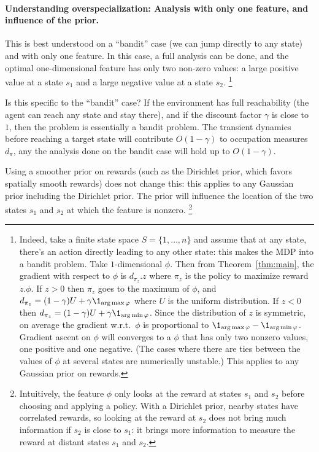 \documentclass[11pt,a4paper]{article}
\begin{document}
\paragraph{Understanding overspecialization: Analysis with only one
feature, and influence of the prior.}
This is best understood on a ``bandit'' case (we can jump directly to any
state) and with only one feature.
In this case, a full analysis can be done, and the optimal
one-dimensional feature has only two non-zero values: a large positive
value at a state $s_1$ and a large negative value at a state $s_2$.
\footnote{Indeed, take
a finite state space $S=\{1,\ldots,n\}$ and assume that at any state,
there's an action directly leading to any other state: this makes the MDP
into a bandit problem.
Take $1$-dimensional $\phi$. Then from
Theorem~\ref{thm:main}, the gradient with respect to $\phi$ is
$d_{\pi_z}.z$ where $\pi_z$ is the policy to maximize reward $z.\phi$. If
$z>0$ then $\pi_z$ goes to the maximum of $\phi$, and
$d_{\pi_z}=(1-\gamma)U+\gamma \1_{\argmax \phi}$ where $U$ is the uniform
distribution. If $z<0$ then $d_{\pi_z}=(1-\gamma)U+\gamma \1_{\argmin
\phi}$. Since the distribution of $z$ is symmetric, on average the
gradient w.r.t.\ $\phi$ is proportional to $\1_{\argmax
\phi}-\1_{\argmin\phi}$. Gradient ascent on $\phi$ will converges to a
$\phi$ that has only two nonzero values, one positive and one negative.
(The cases where there are ties between the values of $\phi$ at several
states are numerically unstable.)
This applies to any Gaussian prior on rewards.
}

Is this specific to the ``bandit'' case? If the environment has full
reachability (the agent can reach any state and stay there), and if
the discount factor $\gamma$ is close to $1$, then the problem is
essentially a bandit problem. The transient dynamics before reaching a
target state will contribute $O(1-\gamma)$ to occupation measures
$d_\pi$, any the analysis done on the bandit case will hold up to
$O(1-\gamma)$.

Using a smoother prior on rewards (such as the Dirichlet prior, which
favors spatially smooth rewards) does not change this: this applies to
any Gaussian prior including the Dirichlet prior. The prior will
influence the location of the two states $s_1$ and $s_2$ at which the
feature is nonzero. \footnote{Intuitively, the feature $\phi$ only looks
at the reward at states $s_1$ and $s_2$ before choosing and applying a
policy.  With a Dirichlet prior, nearby states have correlated rewards,
so looking at the reward at $s_2$ does not bring much information if
$s_2$ is close to $s_1$: it brings more information to measure the reward at distant states
$s_1$ and $s_2$.
}
\end{document}

